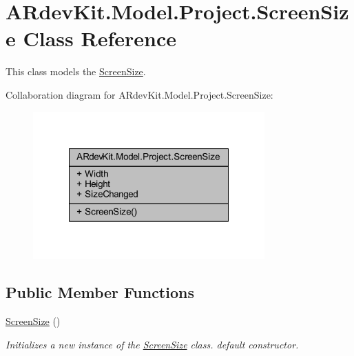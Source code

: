\hypertarget{class_a_rdev_kit_1_1_model_1_1_project_1_1_screen_size}{\section{A\-Rdev\-Kit.\-Model.\-Project.\-Screen\-Size Class Reference}
\label{class_a_rdev_kit_1_1_model_1_1_project_1_1_screen_size}
}


This class models the \hyperlink{class_a_rdev_kit_1_1_model_1_1_project_1_1_screen_size}{Screen\-Size}.  




Collaboration diagram for A\-Rdev\-Kit.\-Model.\-Project.\-Screen\-Size\-:
\nopagebreak
\begin{figure}[H]
\begin{center}
\leavevmode
\includegraphics[width=252pt]{class_a_rdev_kit_1_1_model_1_1_project_1_1_screen_size__coll__graph}
\end{center}
\end{figure}
\subsection*{Public Member Functions}
\begin{DoxyCompactItemize}
\item 
\hyperlink{class_a_rdev_kit_1_1_model_1_1_project_1_1_screen_size_a2f80d6e44cc5d7e94c3b5b3ba1b0019f}{Screen\-Size} ()
\begin{DoxyCompactList}\small\item\em Initializes a new instance of the \hyperlink{class_a_rdev_kit_1_1_model_1_1_project_1_1_screen_size}{Screen\-Size} class. default constructor. \end{DoxyCompactList}\end{DoxyCompactItemize}
